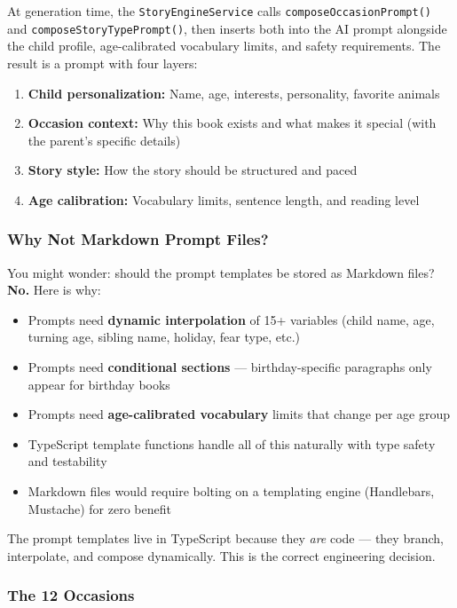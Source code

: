 \documentclass[12pt, letterpaper, oneside]{book}
\begin{document}
At generation time, the \texttt{StoryEngineService} calls \texttt{composeOccasionPrompt()} and \texttt{composeStoryTypePrompt()}, then inserts both into the AI prompt alongside the child profile, age-calibrated vocabulary limits, and safety requirements. The result is a prompt with four layers:

\begin{enumerate}[leftmargin=2em]
  \item \textbf{Child personalization:} Name, age, interests, personality, favorite animals
  \item \textbf{Occasion context:} Why this book exists and what makes it special (with the parent's specific details)
  \item \textbf{Story style:} How the story should be structured and paced
  \item \textbf{Age calibration:} Vocabulary limits, sentence length, and reading level
\end{enumerate}

\subsubsection*{Why Not Markdown Prompt Files?}

You might wonder: should the prompt templates be stored as Markdown files? \textbf{No.} Here is why:

\begin{itemize}[leftmargin=2em]
  \item Prompts need \textbf{dynamic interpolation} of 15+ variables (child name, age, turning age, sibling name, holiday, fear type, etc.)
  \item Prompts need \textbf{conditional sections} --- birthday-specific paragraphs only appear for birthday books
  \item Prompts need \textbf{age-calibrated vocabulary} limits that change per age group
  \item TypeScript template functions handle all of this naturally with type safety and testability
  \item Markdown files would require bolting on a templating engine (Handlebars, Mustache) for zero benefit
\end{itemize}

The prompt templates live in TypeScript because they \textit{are} code --- they branch, interpolate, and compose dynamically. This is the correct engineering decision.

\subsubsection*{The 12 Occasions}
\end{document}
